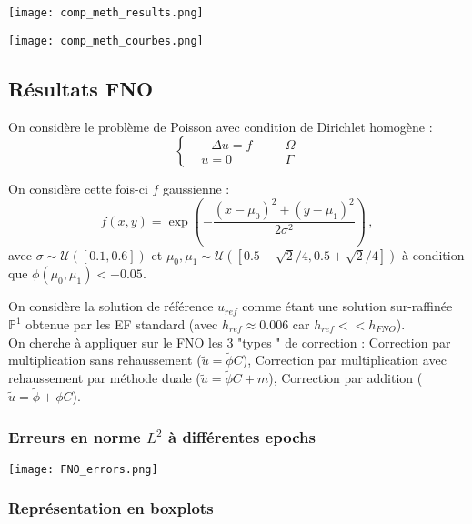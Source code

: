 \begin{minipage}{\linewidth}
	\centering
	\texttt{[image: comp\_meth\_results.png]}
\end{minipage}

\begin{minipage}{\linewidth}
	\centering
	\texttt{[image: comp\_meth\_courbes.png]}
\end{minipage}

\subsection{Résultats FNO}

On considère le problème de Poisson avec condition de Dirichlet homogène :
\begin{equation*}
	\left\{\begin{aligned}
		&-\Delta u=f \quad &&\Omega \\
		&u=0 \quad &&\Gamma
	\end{aligned}\right.
\end{equation*}

On considère cette fois-ci $f$ gaussienne :
$$f(x,y) = \exp\left(-\frac{(x-\mu_0)^2 + (y-\mu_1)^2}{2\sigma^2}\right)\,, $$ 
avec $\sigma \sim \mathcal{U}([0.1,0.6])$ et $\mu_0, \mu_1 \sim \mathcal{U}([0.5-\sqrt{2}/4, 0.5+\sqrt{2}/4])$ à condition que $\phi(\mu_0, \mu_1) < -0.05$.

On considère la solution de référence $u_{ref}$ comme étant une solution sur-raffinée $\mathbb{P}^1$ obtenue par les EF standard (avec $h_{ref}\approx 0.006$ car $h_{ref}<<h_{FNO}$). \\

On cherche à appliquer sur le FNO les 3 "types " de correction : Correction par multiplication sans rehaussement ($\tilde{u} = \tilde{\phi}C$), Correction par multiplication avec rehaussement par méthode duale ($\tilde{u} = \tilde{\phi}C+m$), Correction par addition ($\tilde{u}=\tilde{\phi}+\phi C$).

\subsubsection*{Erreurs en norme $L^2$ à différentes epochs}

\begin{minipage}{\linewidth}
	\centering
	\texttt{[image: FNO\_errors.png]}
\end{minipage}

\subsubsection*{Représentation en boxplots}

